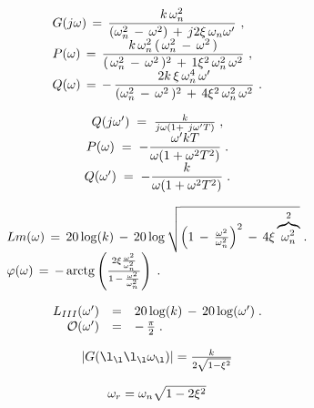 \documentclass{article}
\begin{document}
\[
$$
\begin{array} {l} {{G ( j \omega) \,=\, \displaystyle\frac{k \, \omega_{n}^{2}} {( \omega_{n}^{2} \,-\, \omega^{2} ) \,+\, j 2 \xi\, \omega_{n} \omega^{\prime}} ~,}} \\ {{\displaystyle P ( \omega) \,=\, \displaystyle\frac{k \, \omega_{n}^{2} \, ( \, \omega_{n}^{2} \,-\, \omega^{2} \, )} {( \, \omega_{n}^{2} \,-\, \omega^{2} \, )^{2} \,+\, 1 \xi^{2} \, \omega_{n}^{2} \, \omega^{2}} ~,}} \\ {{\displaystyle Q ( \omega) \,=\,-\, \displaystyle\frac{2 k \, \xi\, \omega_{n}^{4} \, \omega^{\prime}} {( \omega_{n}^{2} \,-\, \omega^{2} \, )^{2} \,+\, 4 \xi^{2} \, \omega_{n}^{2} \, \omega^{2}} ~.}} \end{array}
$$
\]

\[
$$
\begin{array} {c} {{Q ( j \omega^{\prime} ) \;=\; \frac{k} {j \omega( 1+\ j \omega^{\prime} T )} \;,}} \\ {{P ( \omega) \;=\;-\displaystyle\frac{\omega^{\prime} k T} {\omega( 1+\omega^{2} T^{2} )} \;.}} \\ {{Q ( \omega^{\prime} ) \;=\;-\displaystyle\frac{k} {\omega( 1+\omega^{2} T^{2} )} \;.}} \end{array}
$$
\]

\[
$$
\begin{array} {l} {{L m ( \omega) \,=\, 2 0 \log( k ) \,-\, 2 0 \log\sqrt{\left( 1 \,-\, \frac{\omega^{2}} {\omega_{n}^{2}} \right)^{2} \,-\, 4 \xi\overbrace{\omega_{n}^{2}}^{2}} \;.}} \\ {{\varphi( \omega) \,=\,-\operatorname{a r c t g} \left( \frac{2 \xi\frac{\omega^{2}} {\omega_{n}^{2}}} {1 \,-\, \frac{\omega^{2}} {\omega_{n}^{2}}} \right) \;.}} \end{array}
$$
\]

\[
$$
\begin{array} {r c l} {{L_{I I I} ( \omega^{\prime} )}} & {{=}} & {{2 0 \log( k ) \,-\, 2 0 \log( \omega^{\prime} ) \;.}} \\ {{\mathcal{O} ( \omega^{\prime} )}} & {{=}} & {{-\, \frac{\pi} {2} \;.}} \\ \end{array}
$$
\]

\[
$$
| G ( \l_{\l} \l_{\l} \omega_{\l} ) |=\frac{k} {2 \sqrt{1-\xi^{2}}}
$$
\]

\[
$$
\omega_{r}=\omega_{n} \sqrt{1-2 \xi^{2}}
$$
\]
\end{document}
